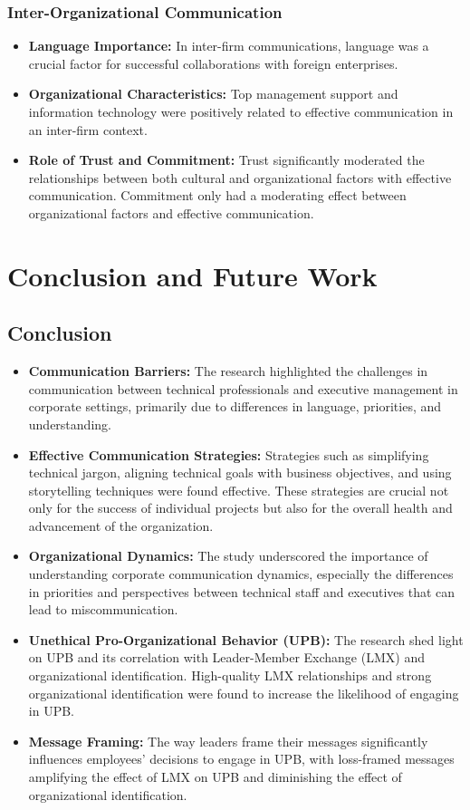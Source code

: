 \documentclass[runningheads]{llncs}
\begin{document}
\subsubsection{Inter-Organizational Communication}
\begin{itemize}
    \item \textbf{Language Importance:} In inter-firm communications, language was a crucial factor for successful collaborations with foreign enterprises.
    \item \textbf{Organizational Characteristics:} Top management support and information technology were positively related to effective communication in an inter-firm context. 
    \item \textbf{Role of Trust and Commitment:} Trust significantly moderated the relationships between both cultural and organizational factors with effective communication. Commitment only had a moderating effect between organizational factors and effective communication.
\end{itemize}

\section{Conclusion and Future Work}

\subsection{Conclusion}
\begin{itemize}
    \item \textbf{Communication Barriers:} The research highlighted the challenges in communication between technical professionals and executive management in corporate settings, primarily due to differences in language, priorities, and understanding.
    \item \textbf{Effective Communication Strategies:} Strategies such as simplifying technical jargon, aligning technical goals with business objectives, and using storytelling techniques were found effective. These strategies are crucial not only for the success of individual projects but also for the overall health and advancement of the organization.
    \item \textbf{Organizational Dynamics:} The study underscored the importance of understanding corporate communication dynamics, especially the differences in priorities and perspectives between technical staff and executives that can lead to miscommunication.
    \item \textbf{Unethical Pro-Organizational Behavior (UPB):} The research shed light on UPB and its correlation with Leader-Member Exchange (LMX) and organizational identification. High-quality LMX relationships and strong organizational identification were found to increase the likelihood of engaging in UPB. \cite{ref_article01}
    \item \textbf{Message Framing:} The way leaders frame their messages significantly influences employees' decisions to engage in UPB, with loss-framed messages amplifying the effect of LMX on UPB and diminishing the effect of organizational identification.
\end{itemize}
\end{document}
